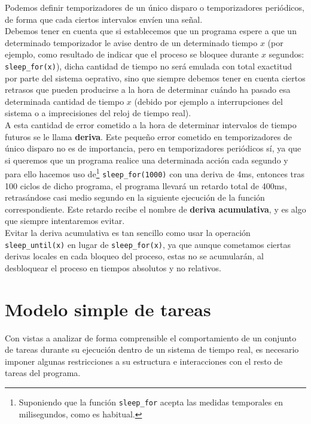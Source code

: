 Podemos definir temporizadores de un único disparo o temporizadores periódicos, de forma que cada ciertos intervalos envíen una señal.\\

Debemos tener en cuenta que si establecemos que un programa espere a que un determinado temporizador le avise dentro de un determinado tiempo $x$ (por ejemplo, como resultado de indicar que el proceso se bloquee durante $x$ segundos: \verb|sleep_for(x)|), dicha cantidad de tiempo no será emulada con total exactitud por parte del sistema oeprativo, sino que siempre debemos tener en cuenta ciertos retrasos que pueden producirse a la hora de determinar cuándo ha pasado esa determinada cantidad de tiempo $x$ (debido por ejemplo a interrupciones del sistema o a imprecisiones del reloj de tiempo real).\\

A esta cantidad de error cometido a la hora de determinar intervalos de tiempo futuros se le llama \textbf{deriva}. Este pequeño error cometido en temporizadores de único disparo no es de importancia, pero en temporizadores periódicos sí, ya que si queremos que un programa realice una determinada acción cada segundo y para ello hacemos uso de\footnote{Suponiendo que la función \texttt{sleep\_for} acepta las medidas temporales en milisegundos, como es habitual.} \verb|sleep_for(1000)| con una deriva de 4ms, entonces tras 100 ciclos de dicho programa, el programa llevará un retardo total de 400ms, retrasándose casi medio segundo en la siguiente ejecución de la función correspondiente. Este retardo recibe el nombre de \textbf{deriva acumulativa}, y es algo que siempre intentaremos evitar.\\

Evitar la deriva acumulativa es tan sencillo como usar la operación \verb|sleep_until(x)| en lugar de \verb|sleep_for(x)|, ya que aunque cometamos ciertas derivas locales en cada bloqueo del proceso, estas no se acumularán, al desbloquear el proceso en tiempos absolutos y no relativos.

\section{Modelo simple de tareas}
Con vistas a analizar de forma comprensible el comportamiento de un conjunto de tareas durante su ejecución dentro de un sistema de tiempo real, es necesario imponer algunas restricciones a su estructura e interacciones con el resto de tareas del programa.\\

